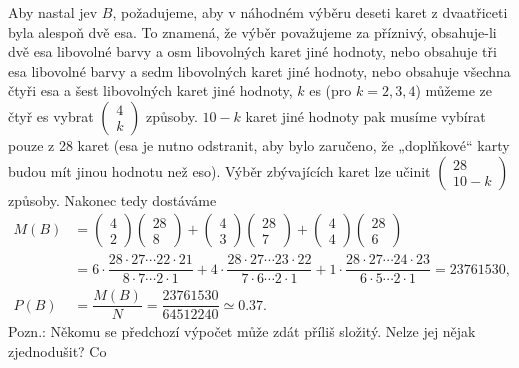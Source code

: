 \begin{example}
    Aby nastal jev \(B\), požadujeme, aby v náhodném výběru deseti karet z dvaatřiceti byla alespoň 
    dvě esa. To znamená, že výběr považujeme za příznivý, obsahuje-li dvě esa libovolné barvy a osm 
    libovolných karet jiné hodnoty, nebo obsahuje tři esa libovolné barvy a sedm libovolných karet 
    jiné hodnoty, nebo obsahuje všechna čtyři esa a šest libovolných karet jiné hodnoty, \(k\) es 
    (pro \(k = 2, 3, 4\)) můžeme ze čtyř es vybrat \(\begin{pmatrix} 4 \\ k\end{pmatrix}\) způsoby.
    \(10 - k\) karet jiné hodnoty pak musíme vybírat pouze z \num{28} karet (esa je nutno 
    odstranit, aby bylo zaručeno, že „doplňkové“ karty budou mít jinou hodnotu než eso). Výběr 
    zbývajících karet lze učinit \(\begin{pmatrix} 28 \\ 10 - k\end{pmatrix}\) způsoby. Nakonec 
    tedy dostáváme
    \begin{align*}
      M(B) &=  \begin{pmatrix} 4 \\ 2\end{pmatrix}\begin{pmatrix} 28 \\ 8\end{pmatrix}
              +\begin{pmatrix} 4 \\ 3\end{pmatrix}\begin{pmatrix} 28 \\ 7\end{pmatrix}
              +\begin{pmatrix} 4 \\ 4\end{pmatrix}\begin{pmatrix} 28 \\ 6\end{pmatrix}         \\
           &=  6\cdot\dfrac{28\cdot27\cdots22\cdot21}{8\cdot7\cdots2\cdot1}
              +4\cdot\dfrac{28\cdot27\cdots23\cdot22}{7\cdot6\cdots2\cdot1}
              +1\cdot\dfrac{28\cdot27\cdots24\cdot23}{6\cdot5\cdots2\cdot1} = \num{23761530},  \\
      P(B) &= \dfrac{M(B)}{N} = \dfrac{\num{23761530}}{\num{64512240}} \simeq\num{0.37}.
    \end{align*}
    Pozn.: Někomu se předchozí výpočet může zdát příliš složitý. Nelze jej nějak zjednodušit? Co 

\end{example}
